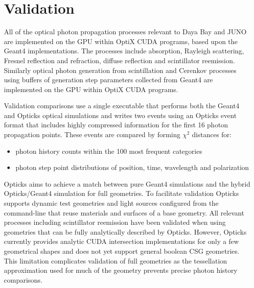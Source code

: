 \documentclass[a4paper]{jpconf}
\begin{document}
\section{Validation}


All of the optical photon propagation processes relevant to Daya Bay and JUNO
are implemented on the GPU within OptiX CUDA programs, based upon the Geant4 implementations. 
The processes include absorption, Rayleigh scattering, Fresnel reflection and refraction, diffuse reflection
and scintillator reemission. Similarly optical photon generation from scintillation and Cerenkov processes
using buffers of generation step parameters collected from Geant4
are implemented on the GPU within OptiX CUDA programs.

Validation comparisons use a single executable that performs both
the Geant4 and Opticks optical simulations and writes two events using
an Opticks event format that includes highly compressed information
for the first 16 photon propagation points.
These events are compared by forming $\chi^{2}$ distances for:

\begin{itemize}
\item photon history counts within the 100 most frequent categories
\item photon step point distributions of position, time, wavelength and polarization 
\end{itemize}

Opticks aims to achieve a match between pure Geant4 simulations and the hybrid 
Opticks/Geant4 simulation for full geometries. 
To facilitate validation Opticks supports dynamic test geometries and light sources
configured from the command-line that reuse materials and surfaces of a base geometry.
All relevant processes including scintillator reemission have been validated 
when using geometries that can be fully analytically described by Opticks. 
However, Opticks currently provides analytic CUDA intersection implementations 
for only a few geometrical shapes and does not yet support general boolean CSG geometries.  
This limitation complicates validation of full geometries as the tessellation 
approximation used for much of the geometry prevents precise photon history comparisons.
\end{document}
